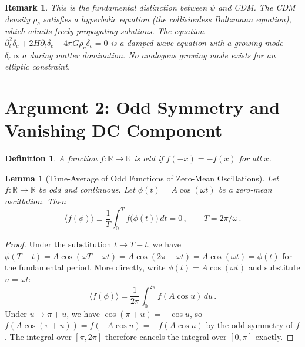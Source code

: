 \documentclass[12pt,a4paper]{article}
\newtheorem{lemma}[theorem]{Lemma}
\newtheorem{definition}[theorem]{Definition}
\newtheorem{remark}{Remark}
\begin{document}
\begin{remark}
This is the fundamental distinction between $\psi$ and CDM. The CDM
density $\rho_c$ satisfies a \emph{hyperbolic} equation (the collisionless
Boltzmann equation), which admits freely propagating solutions. The
equation $\partial_t^2 \delta_c + 2H\partial_t\delta_c - 4\pi G\rho_c\delta_c = 0$
is a damped wave equation with a growing mode $\delta_c \propto a$
during matter domination. No analogous growing mode exists for an
elliptic constraint.
\end{remark}

\section{Argument 2: Odd Symmetry and Vanishing DC Component}
\label{sec:arg2}

\begin{definition}
\label{def:odd}
A function $f: \mathbb{R} \to \mathbb{R}$ is \emph{odd} if
$f(-x) = -f(x)$ for all $x$.
\end{definition}

\begin{lemma}[Time-Average of Odd Functions of Zero-Mean Oscillations]
\label{lem:odd-zero}
Let $f: \mathbb{R} \to \mathbb{R}$ be odd and continuous. Let
$\phi(t) = A\cos(\omega t)$ be a zero-mean oscillation. Then
\begin{equation}
\langle f(\phi) \rangle \equiv \frac{1}{T}\int_0^T f\bigl(\phi(t)\bigr)\,dt = 0\,,
\qquad T = 2\pi/\omega\,.
\end{equation}
\end{lemma}

\begin{proof}
Under the substitution $t \to T - t$, we have $\phi(T-t) = A\cos(\omega T - \omega t)
= A\cos(2\pi - \omega t) = A\cos(\omega t) = \phi(t)$ for the
fundamental period. More directly, write $\phi(t) = A\cos(\omega t)$
and substitute $u = \omega t$:
\begin{equation}
\langle f(\phi)\rangle = \frac{1}{2\pi}\int_0^{2\pi} f(A\cos u)\,du\,.
\end{equation}
Under $u \to \pi + u$, we have $\cos(\pi + u) = -\cos u$, so
$f(A\cos(\pi+u)) = f(-A\cos u) = -f(A\cos u)$ by the odd symmetry
of $f$. The integral over $[\pi, 2\pi]$ therefore cancels the integral
over $[0,\pi]$ exactly.
\end{proof}
\end{document}
